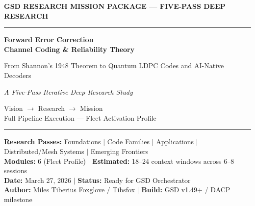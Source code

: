 \documentclass[11pt,letterpaper]{article}
\begin{document}
\thispagestyle{empty}
\begin{center}
\vspace*{2.5cm}

{\small\sffamily\textcolor{primary}{\textbf{GSD RESEARCH MISSION PACKAGE --- FIVE-PASS DEEP RESEARCH}}}

\vspace{0.3cm}
\textcolor{bordergray}{\rule{10cm}{0.4pt}}

\vspace{1.5cm}
{\fontsize{28}{34}\selectfont\bfseries\sffamily\textcolor{primary}{Forward Error Correction\\[0.3em]Channel Coding \& Reliability Theory}}

\vspace{0.8cm}
{\Large\sffamily\textcolor{secondary}{From Shannon's 1948 Theorem to Quantum LDPC Codes and AI-Native Decoders}}

\vspace{0.5cm}
{\large\sffamily\itshape\textcolor{tertiary}{A Five-Pass Iterative Deep Research Study}}

\vspace{2.5cm}
{\sffamily\textcolor{accent}{Vision $\rightarrow$ Research $\rightarrow$ Mission}}\\[0.3em]
{\small\sffamily\textcolor{accent}{Full Pipeline Execution --- Fleet Activation Profile}}

\vspace{1.5cm}
\begin{center}
\textcolor{bordergray}{\rule{8cm}{0.4pt}}
\end{center}
\vspace{0.5cm}

{\small\sffamily\textcolor{subtlegray}{
\textbf{Research Passes:} Foundations $|$ Code Families $|$ Applications $|$ Distributed/Mesh Systems $|$ Emerging Frontiers\\[0.3em]
\textbf{Modules:} 6 (Fleet Profile) $|$ \textbf{Estimated:} 18--24 context windows across 6--8 sessions\\[0.3em]
\textbf{Date:} March 27, 2026 $|$ \textbf{Status:} Ready for GSD Orchestrator\\[0.3em]
\textbf{Author:} Miles Tiberius Foxglove / Tibsfox $|$ \textbf{Build:} GSD v1.49+ / DACP milestone
}}
\end{center}
\newpage

\tableofcontents
\newpage
\end{document}
